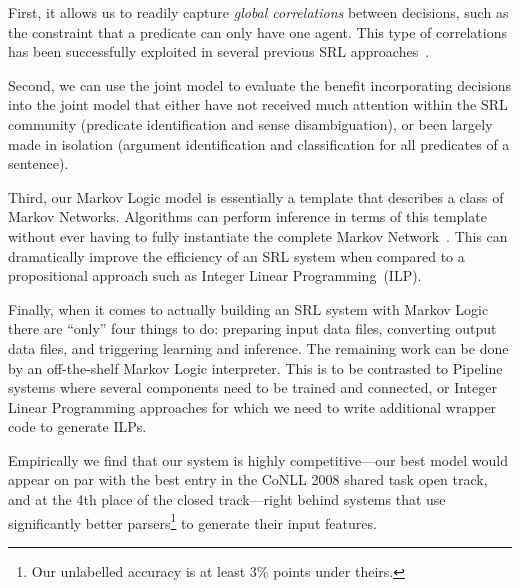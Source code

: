 First, it allows us to readily capture \emph{global correlations}
between decisions, such as the constraint that a predicate can only
have one agent. This type of correlations has been successfully 
exploited in several previous SRL approaches~\citep{toutanova05joint,punyakanok05generalized}. 

Second, we can use the joint model to evaluate the benefit incorporating
decisions into the joint model that either have not received much
attention within the SRL community (predicate identification and sense
disambiguation), or been largely made in isolation (argument identification and classification for all predicates of a sentence). 

Third, our Markov Logic model is essentially a template that describes
a class of Markov Networks.
Algorithms can perform inference in terms of this template without
ever having to fully instantiate the complete Markov
Network~\citep{riedel08improving,singla2008lfo}. This can dramatically improve the efficiency of an SRL system when
compared to a propositional approach such as Integer Linear Programming~(ILP).


Finally, when it comes to actually building an SRL system with Markov
Logic 
there are ``only''
four things
to do: preparing input data files, converting
output data files, and triggering learning and inference. The remaining
work can be done by an off-the-shelf Markov Logic interpreter. This
is to be contrasted to Pipeline systems where several components need
to be trained and connected, or Integer Linear Programming approaches for which we need
to write additional wrapper code to generate ILPs.

Empirically we find that our system is highly competitive---our best
model would appear on par with the best entry in the CoNLL 2008
shared task open track, and at
the 4th place of the closed track---right behind systems that use
significantly better parsers\footnote{Our unlabelled accuracy is at least 3\% points under theirs.} to generate their input features.

